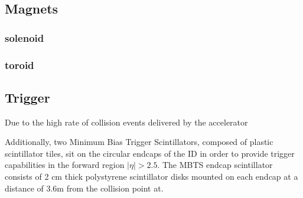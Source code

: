 \subsection{Magnets} \label{sec:Magnets}


\subsubsection{solenoid} \label{sec:solenoid} 

\subsubsection{toroid} \label{sec:toroid} 




\subsection{Trigger} \label{sec:Trigger}
Due to the high rate of collision events delivered by the accelerator 

Additionally, two Minimum Bias Trigger Scintillators, composed of plastic scintillator tiles, sit on the circular endcaps of the ID in order to provide trigger capabilities in the forward region \(|\eta| > 2.5 \). The MBTS endcap scintillator consists of 2 cm thick polystyrene scintillator disks mounted on each endcap at a distance of 3.6m from the collision point at. 
